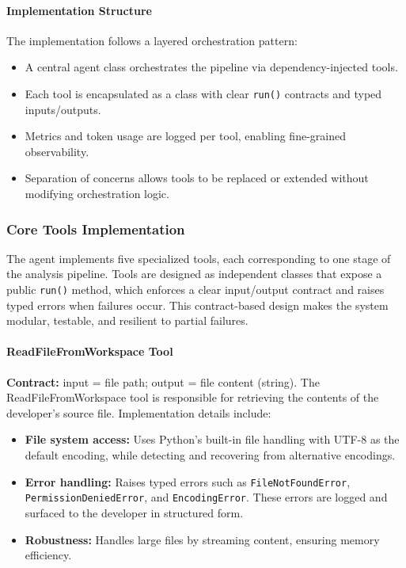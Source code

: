 \begin{spacing}{1.2}
\paragraph{Implementation Structure}
The implementation follows a layered orchestration pattern:
\begin{itemize}
    \item A central agent class orchestrates the pipeline via dependency-injected tools.
    \item Each tool is encapsulated as a class with clear \texttt{run()} contracts and typed inputs/outputs.
    \item Metrics and token usage are logged per tool, enabling fine-grained observability.
    \item Separation of concerns allows tools to be replaced or extended without modifying orchestration logic.
\end{itemize}

\subsubsection{Core Tools Implementation}
The agent implements five specialized tools, each corresponding to one stage of the analysis pipeline. Tools are designed as independent classes that expose a public \texttt{run()} method, which enforces a clear input/output contract and raises typed errors when failures occur. This contract-based design makes the system modular, testable, and resilient to partial failures.

\paragraph{ReadFileFromWorkspace Tool}
\textbf{Contract:} input = file path; output = file content (string).  
The ReadFileFromWorkspace tool is responsible for retrieving the contents of the developer’s source file. Implementation details include:
\begin{itemize}
    \item \textbf{File system access:} Uses Python’s built-in file handling with UTF-8 as the default encoding, while detecting and recovering from alternative encodings.
    \item \textbf{Error handling:} Raises typed errors such as \texttt{FileNotFoundError}, \texttt{PermissionDeniedError}, and \texttt{EncodingError}. These errors are logged and surfaced to the developer in structured form.
    \item \textbf{Robustness:} Handles large files by streaming content, ensuring memory efficiency.
\end{itemize}


\end{spacing}
